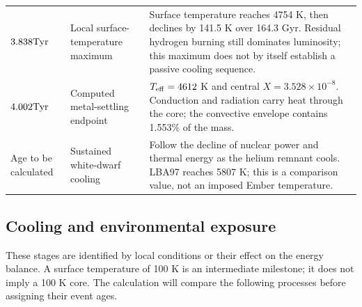 {\begin{tabular}{@{}>{\raggedright\arraybackslash}p{}
 >{\raggedright\arraybackslash}p{}
 >{\raggedright\arraybackslash}p{}@{}}
$3.838\mathrm{Tyr}$ & Local surface-temperature maximum &
Surface temperature reaches 4754 K, then declines by 141.5 K over
164.3 Gyr. Residual hydrogen burning still dominates luminosity; this
maximum does not by itself establish a passive cooling sequence. \\[4pt]
$4.002\mathrm{Tyr}$ & Computed metal-settling endpoint &
$T_{\rm eff}=4612$ K and central $X=3.528\times10^{-8}$.
Conduction and radiation carry heat through the core; the convective
envelope contains 1.553\% of the mass. \\[4pt]
Age to be calculated & Sustained white-dwarf cooling &
Follow the decline of nuclear power and thermal energy as the helium
remnant cools. LBA97 reaches 5807 K; this is a comparison value, not an
imposed Ember temperature. \\
\bottomrule
\end{tabular}}

\clearpage
\subsection{Cooling and environmental exposure}
These stages are identified by local conditions or their effect on the energy
balance. A surface temperature of 100 K is an intermediate milestone; it
does not imply a 100 K core. The calculation will compare the following
processes before assigning their event ages.

